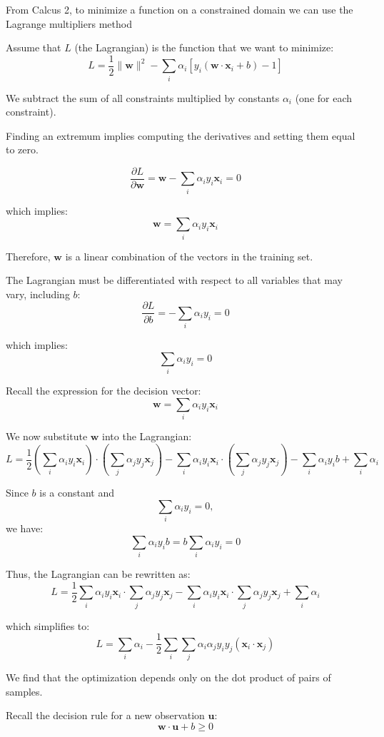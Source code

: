 From Calcus 2, to minimize a function on a constrained domain we can use the Lagrange multipliers method

Assume that $L$ (the Lagrangian) is the function that we want to minimize:
\[
L = \frac{1}{2}\|\mathbf{w}\|^2 - \sum_i \alpha_i \left[ y_i (\mathbf{w} \cdot \mathbf{x}_i + b) - 1 \right]
\]

We subtract the sum of all constraints multiplied by constants $\alpha_i$ (one for each constraint).

Finding an extremum implies computing the derivatives and setting them equal to zero.



\[
\frac{\partial L}{\partial \mathbf{w}} = \mathbf{w} - \sum_i \alpha_i y_i \mathbf{x}_i = 0
\]

which implies:
\[
\mathbf{w} = \sum_i \alpha_i y_i \mathbf{x}_i
\]

Therefore, $\mathbf{w}$ is a linear combination of the vectors in the training set.


The Lagrangian must be differentiated with respect to all variables that may vary, including $b$:
\[
\frac{\partial L}{\partial b} = - \sum_i \alpha_i y_i = 0
\]

which implies:
\[
\sum_i \alpha_i y_i = 0
\]


Recall the expression for the decision vector:
\[
\mathbf{w} = \sum_i \alpha_i y_i \mathbf{x}_i
\]

We now substitute $\mathbf{w}$ into the Lagrangian:
\[
L =
\frac{1}{2}
\left(
\sum_i \alpha_i y_i \mathbf{x}_i
\right)
\cdot
\left(
\sum_j \alpha_j y_j \mathbf{x}_j
\right)
-
\sum_i \alpha_i y_i \mathbf{x}_i
\cdot
\left(
\sum_j \alpha_j y_j \mathbf{x}_j
\right)
-
\sum_i \alpha_i y_i b
+
\sum_i \alpha_i
\]

Since $b$ is a constant and
\[
\sum_i \alpha_i y_i = 0,
\]
we have:
\[
\sum_i \alpha_i y_i b = b \sum_i \alpha_i y_i = 0
\]

Thus, the Lagrangian can be rewritten as:
\[
L =
\frac{1}{2}
\sum_i \alpha_i y_i \mathbf{x}_i
\cdot
\sum_j \alpha_j y_j \mathbf{x}_j
-
\sum_i \alpha_i y_i \mathbf{x}_i
\cdot
\sum_j \alpha_j y_j \mathbf{x}_j
+
\sum_i \alpha_i
\]

which simplifies to:
\[
L =
\sum_i \alpha_i
-
\frac{1}{2}
\sum_i
\sum_j
\alpha_i \alpha_j y_i y_j
(\mathbf{x}_i \cdot \mathbf{x}_j)
\]


We find that the optimization depends only on the dot product of pairs of samples.


Recall the decision rule for a new observation $\mathbf{u}$:
\[
\mathbf{w} \cdot \mathbf{u} + b \ge 0
\]

